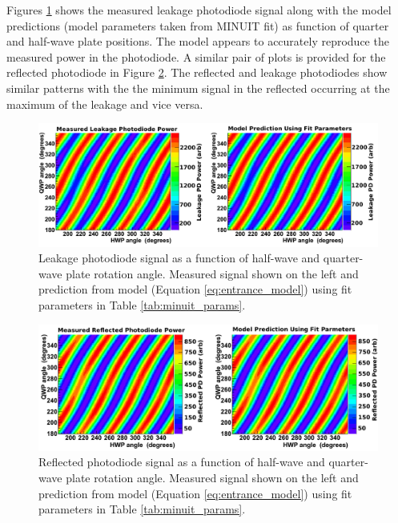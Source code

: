 Figures \ref{fig:RRPD_scan} shows the measured leakage photodiode signal along with the model predictions (model parameters taken from MINUIT fit) as function of quarter and half-wave plate positions. The model appears to accurately reproduce the measured power in the photodiode. A similar pair of plots is provided for the reflected photodiode in Figure \ref{fig:RPD_scan}. The reflected and leakage photodiodes show similar patterns with the the minimum signal in the reflected occurring at the maximum of the leakage and vice versa. 
\begin{figure}
\centering
\includegraphics[width=5.6in]{./Pictures/RRPD_scan.png}
\caption{\label{fig:RRPD_scan}Leakage photodiode signal as a function of half-wave and quarter-wave plate rotation angle. Measured signal shown on the left and prediction from model (Equation \ref{eq:entrance_model}) using fit parameters in Table \ref{tab:minuit_params}.}
\end{figure}

\begin{figure}
\centering
\includegraphics[width=5.6in]{./Pictures/RPD_scan.png}
\caption{\label{fig:RPD_scan}Reflected photodiode signal as a function of half-wave and quarter-wave plate rotation angle. Measured signal shown on the left and prediction from model (Equation \ref{eq:entrance_model}) using fit parameters in Table \ref{tab:minuit_params}.}
\end{figure}

